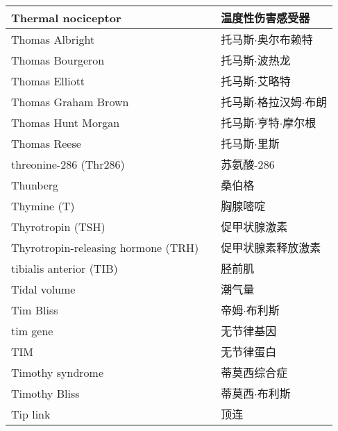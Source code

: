\begin{longtable}{lll}
	\midrule
	Thermal nociceptor  && 温度性伤害感受器  \\
	
	\midrule
	Thomas Albright  && 托马斯$\cdot$奥尔布赖特  \\
	
	\midrule
	Thomas Bourgeron  && 托马斯$\cdot$波热龙  \\
	
	\midrule
	Thomas Elliott  && 托马斯$\cdot$艾略特  \\
	
	\midrule
	Thomas Graham Brown  && 托马斯$\cdot$格拉汉姆$\cdot$布朗  \\
	
	\midrule
	Thomas Hunt Morgan  && 托马斯$\cdot$亨特$\cdot$摩尔根  \\
	
	\midrule
	Thomas Reese  && 托马斯$\cdot$里斯  \\
	
	\midrule
	threonine-286 (Thr286) && 苏氨酸-286  \\
	
	\midrule
	Thunberg  && 桑伯格  \\
	
	\midrule
	Thymine (T)  && 胸腺嘧啶  \\
	
	\midrule
	Thyrotropin (TSH) && 促甲状腺激素  \\
	
	\midrule
	Thyrotropin-releasing hormone (TRH) && 促甲状腺素释放激素  \\
	
	\midrule
	tibialis anterior (TIB) && 胫前肌  \\
	
	\midrule
	Tidal volume  && 潮气量  \\
	
	\midrule
	Tim Bliss  && 帝姆$\cdot$布利斯  \\
	
	\midrule
	tim gene  && 无节律基因  \\
	
	\midrule
	TIM  && 无节律蛋白  \\
	
	\midrule
	Timothy syndrome  && 蒂莫西综合症  \\
	
	\midrule
	Timothy Bliss  && 蒂莫西$\cdot$布利斯  \\
	
	\midrule
	Tip link  && 顶连  \\
	

\end{longtable}
